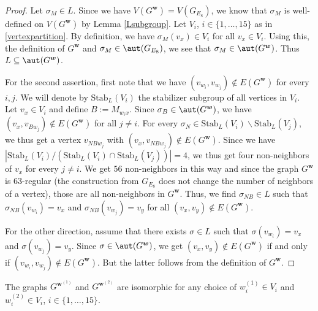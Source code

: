 \begin{proof}
Let $\sigma_M \in L$. Since we have $V(G^{\boldsymbol{w}})=V(G_{E_8})$, we know that $\sigma_M $ is well-defined on $V(G^{\boldsymbol{w}})$ by Lemma \ref{Lsubgroup}. Let $V_i$, $i \in \{1, \dots, 15\}$ as in \eqref{vertexpartition}. By definition, we have $\sigma_M(v_x)\in V_i$ for all $v_x \in V_i$. Using this, the definition of $G^{\boldsymbol{w}}$ and $\sigma_M \in \aut(G_{E_8})$, we see that $\sigma_M \in \aut(G^{\boldsymbol{w}})$. Thus $L \subseteq \aut(G^{\boldsymbol{w}})$.

For the second assertion, first note that we have $(v_{w_i}, v_{w_j})\notin E(G^{\boldsymbol{w}})$ for every $i, j$.  We will denote by $\mathrm{Stab}_L(V_i)$ the stabilizer subgroup of all vertices in $V_i$. Let $v_x \in V_i$ and define $B:=M_{w_ix}$. Since $\sigma_{B}\in \aut(G^{\boldsymbol{w}})$, we have $(v_x, v_{Bw_j})\notin E(G^{\boldsymbol{w}})$ for all $j \neq i$. For every $\sigma_N\in \mathrm{Stab}_L(V_i)\backslash \mathrm{Stab}_L(V_j)$, we thus get a vertex $v_{NBw_j}$ with $(v_x, v_{NBw_j})\notin E(G^{\boldsymbol{w}})$. Since we have $|\mathrm{Stab}_L(V_i)/ (\mathrm{Stab}_L(V_i)\cap \mathrm{Stab}_L(V_j))|=4$, we thus get four non-neighbors of $v_x$ for every $j \neq i$. We get $56$ non-neighbors in this way and since the graph $G^{\boldsymbol{w}}$ is $63$-regular (the construction from $G_{E_8}$ does not change the number of neighbors of a vertex), those are all non-neighbors in $G^{\boldsymbol{w}}$. Thus, we find $\sigma_{NB}\in L$ such that $\sigma_{NB}(v_{w_i})=v_x$ and $\sigma_{NB}(v_{w_j})=v_y$ for all $(v_x,v_y)\notin E(G^{\boldsymbol{w}})$. 

For the other direction, assume that there exists $\sigma\in L$ such that $\sigma(v_{w_i})=v_x$ and $\sigma(v_{w_j})=v_y$. Since $\sigma \in \aut(G^{\boldsymbol{w}})$, we get $(v_x,v_y) \notin E(G^{\boldsymbol{w}})$ if and only if $(v_{w_i}, v_{w_j})\notin E(G^{\boldsymbol{w}})$. But the latter follows from the definition of $G^{\boldsymbol{w}}$.
\end{proof}

\begin{coro}
The graphs $G^{\boldsymbol{w}^{(1)}}$ and $G^{\boldsymbol{w}^{(2)}}$ are isomorphic for any choice of $w_i^{(1)}\in V_i$ and $w_i^{(2)}\in V_i$, $i\in \{1,\dots, 15\}$. 
\end{coro}

